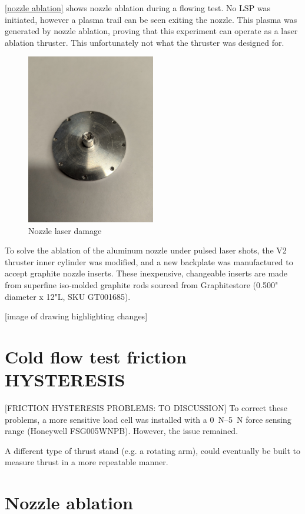                 \autoref{nozzle ablation} shows nozzle ablation during a flowing test. No LSP was initiated, however a plasma trail can be seen exiting the nozzle. This plasma was generated by nozzle ablation, proving that this experiment can operate as a laser ablation thruster. This unfortunately not what the thruster was designed for. 


                
                \begin{figure}[!ht]
                    \centering
                    \includegraphics[width=0.5\textwidth]{assets/4 experiments/Nozzle damage.jpg}
                    \caption{Nozzle laser damage}
                \end{figure}
            
                To solve the ablation of the aluminum nozzle under pulsed laser shots, the V2 thruster inner cylinder was modified, and a new backplate was manufactured to accept graphite nozzle inserts. These inexpensive, changeable inserts are made from superfine iso-molded graphite rods sourced from Graphitestore (0.500" diameter x 12"L, SKU GT001685).
    
                [image of drawing highlighting changes]

    \section{Cold flow test friction HYSTERESIS}

                [FRICTION HYSTERESIS PROBLEMS: TO DISCUSSION] To correct these problems, a more sensitive load cell was installed with a \qtyrange{0}{5}{N} force sensing range (Honeywell FSG005WNPB). However, the issue remained.

            A different type of thrust stand (e.g. a rotating arm), could eventually be built to measure thrust in a more repeatable manner.

    \section{Nozzle ablation}